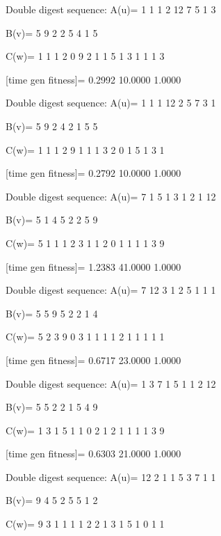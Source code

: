 Double digest sequence:
A(u)=
     1     1     1     2    12     7     5     1     3

B(v)=
     5     9     2     2     5     4     1     5

C(w)=
     1     1     1     2     0     9     2     1     1     5     1     3     1     1     1     3

[time gen fitness]=
    0.2992   10.0000    1.0000

Double digest sequence:
A(u)=
     1     1     1    12     2     5     7     3     1

B(v)=
     5     9     2     4     2     1     5     5

C(w)=
     1     1     1     2     9     1     1     1     3     2     0     1     5     1     3     1

[time gen fitness]=
    0.2792   10.0000    1.0000

Double digest sequence:
A(u)=
     7     1     5     1     3     1     2     1    12

B(v)=
     5     1     4     5     2     2     5     9

C(w)=
     5     1     1     1     2     3     1     1     2     0     1     1     1     1     3     9

[time gen fitness]=
    1.2383   41.0000    1.0000

Double digest sequence:
A(u)=
     7    12     3     1     2     5     1     1     1

B(v)=
     5     5     9     5     2     2     1     4

C(w)=
     5     2     3     9     0     3     1     1     1     1     2     1     1     1     1     1

[time gen fitness]=
    0.6717   23.0000    1.0000

Double digest sequence:
A(u)=
     1     3     7     1     5     1     1     2    12

B(v)=
     5     5     2     2     1     5     4     9

C(w)=
     1     3     1     5     1     1     0     2     1     2     1     1     1     1     3     9

[time gen fitness]=
    0.6303   21.0000    1.0000

Double digest sequence:
A(u)=
    12     2     1     1     5     3     7     1     1

B(v)=
     9     4     5     2     5     5     1     2

C(w)=
     9     3     1     1     1     1     2     2     1     3     1     5     1     0     1     1

